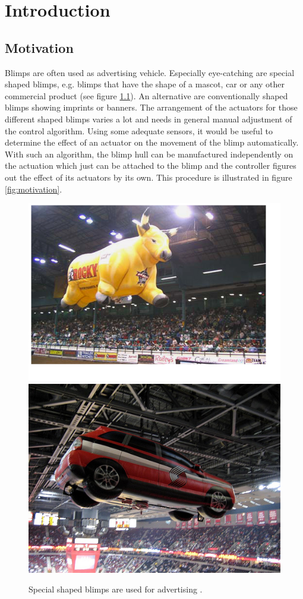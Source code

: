 \chapter{Introduction}
\label{chap:introduction}

\section{Motivation}
Blimps are often used as advertising vehicle. Especially eye-catching are special shaped blimps, e.g. blimps that have the shape of a mascot, car or any other commercial product (see figure \ref{fig:blimps}).
An alternative are conventionally shaped blimps showing imprints or banners.
The arrangement of the actuators for those different shaped blimps varies a lot and needs in general manual adjustment of the control algorithm.
Using some adequate sensors, it would be useful to determine the effect of an actuator on the movement of the blimp automatically.
With such an algorithm, the blimp hull can be manufactured independently on the actuation which just can be attached to the blimp and the controller figures out the effect of its actuators by its own.
This procedure is illustrated in figure \ref{fig:motivation}.

\begin{figure}[hbtp]
\label{fig:blimps}
\centering
\includegraphics[width=.4\linewidth]{images/CustomBull_Lg.jpg}
\includegraphics[width=.4\linewidth]{images/CustomCar.jpg}
\caption{Special shaped blimps are used for advertising \cite{rcblimps}.}
\end{figure}

